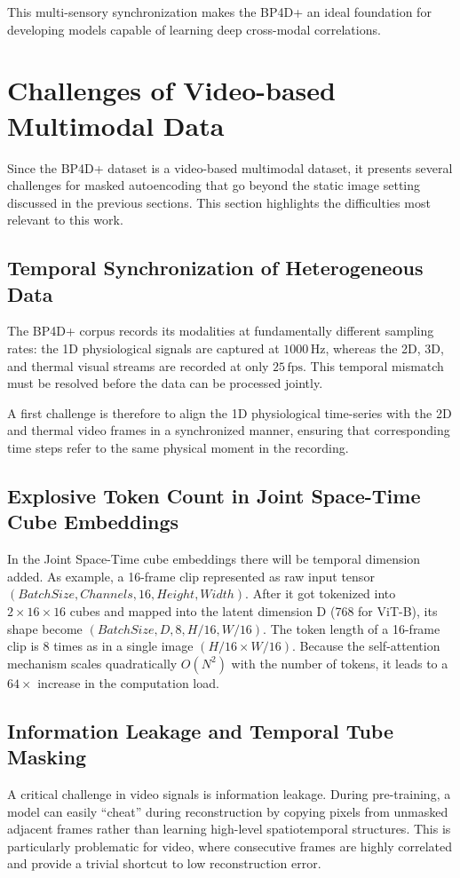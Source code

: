 This multi-sensory synchronization makes the BP4D+ an ideal foundation for
developing models capable of learning deep cross-modal correlations.

\section{Challenges of Video-based Multimodal Data}
Since the BP4D+ dataset is a video-based multimodal dataset, it presents several
challenges for masked autoencoding that go beyond the static image setting
discussed in the previous sections. This section highlights the difficulties most
relevant to this work.

\subsection{Temporal Synchronization of Heterogeneous Data}
The BP4D+ corpus records its modalities at fundamentally different sampling
rates: the 1D physiological signals are captured at $1000\,\mathrm{Hz}$, whereas
the 2D, 3D, and thermal visual streams are recorded at only $25\,\mathrm{fps}$. This
temporal mismatch must be resolved before the data can be processed jointly.

A first challenge is therefore to align the 1D physiological time-series with the
2D and thermal video frames in a synchronized manner, ensuring that
corresponding time steps refer to the same physical moment in the recording.

\subsection{Explosive Token Count in Joint Space-Time Cube Embeddings}
In the Joint Space-Time cube embeddings there will be temporal dimension added. As
example, a 16-frame clip represented as raw input tensor
$(Batch Size, Channel s, 16, Height, Width)$. After it got tokenized into $2\times
16 \times 16$ cubes and mapped into the latent dimension D (768 for ViT-B), its
shape become $(Batch Size, D, 8, H/16, W/16)$. The token length of a 16-frame clip
is 8 times as in a single image $(H/16 \times W/16)$. Because the self-attention
mechanism scales quadratically $O(N^{2})$ with the number of tokens, it leads to
a $64 \times$ increase in the computation load.

\subsection{Information Leakage and Temporal Tube Masking}
A critical challenge in video signals is information leakage. During pre-training,
a model can easily ``cheat'' during reconstruction by copying pixels from unmasked
adjacent frames rather than learning high-level spatiotemporal structures. This
is particularly problematic for video, where consecutive frames are highly correlated
and provide a trivial shortcut to low reconstruction error.

